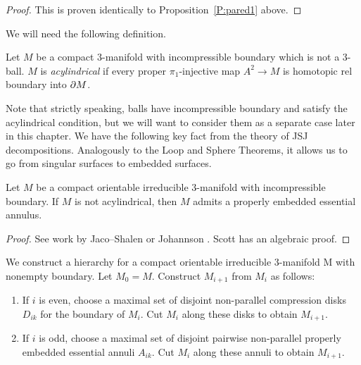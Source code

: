 \begin{proof}

This is proven identically to Proposition~\ref{P:pared1} above.

\end{proof}

We will need the following definition.

\begin{defn}

Let $M$ be a compact $3$-manifold with incompressible boundary which is not
a 3-ball.  $M$ is \emph{acylindrical} if every proper $\pi_1$-injective map
$A^2 \to M$ is homotopic rel boundary into $\partial M$.

\end{defn}

Note that strictly speaking, balls have incompressible boundary and satisfy the
acylindrical condition, but we will want to consider them as a separate case
later in this chapter. We have the following key fact from the theory of JSJ
decompositions.  Analogously to the Loop and Sphere Theorems, it allows us to
go from singular surfaces to embedded surfaces.

\begin{thm}

Let $M$ be a compact orientable irreducible $3$-manifold with incompressible
boundary. If $M$ is not acylindrical, then $M$ admits a properly embedded
essential annulus.

\end{thm}

\begin{proof}

See work by Jaco--Shalen \cite{JacoShalen} or Johannson \cite{Johannson}. Scott
\cite{Scottannulus} has an algebraic proof.

\end{proof}

We construct a hierarchy for a compact orientable irreducible $3$-manifold
M with nonempty boundary.  Let $M_0 = M$.  Construct $M_{i+1}$ from $M_i$ as
follows:

\begin{enumerate}

\item If $i$ is even, choose a maximal set of disjoint non-parallel compression
disks $D_{ik}$ for the boundary of $M_i$. Cut $M_i$ along these disks to obtain
$M_{i+1}$.

\item If $i$ is odd, choose a maximal set of disjoint pairwise non-parallel
properly embedded essential annuli $A_{ik}$. Cut $M_i$ along these annuli to
obtain $M_{i+1}$.

\end{enumerate}

